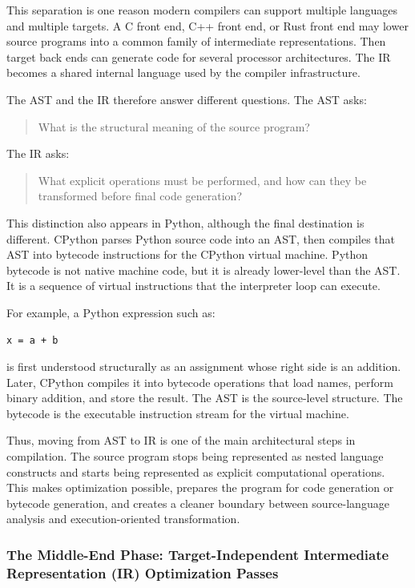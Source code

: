 This separation is one reason modern compilers can support multiple languages and multiple targets. A C front end, C++ front end, or Rust front end may lower source programs into a common family of intermediate representations. Then target back ends can generate code for several processor architectures. The IR becomes a shared internal language used by the compiler infrastructure.

The AST and the IR therefore answer different questions. The AST asks:

\begin{quote}
What is the structural meaning of the source program?
\end{quote}

The IR asks:

\begin{quote}
What explicit operations must be performed, and how can they be transformed before final code generation?
\end{quote}

This distinction also appears in Python, although the final destination is different. CPython parses Python source code into an AST, then compiles that AST into bytecode instructions for the CPython virtual machine. Python bytecode is not native machine code, but it is already lower-level than the AST. It is a sequence of virtual instructions that the interpreter loop can execute.

For example, a Python expression such as:

\begin{verbatim}
x = a + b
\end{verbatim}

is first understood structurally as an assignment whose right side is an addition. Later, CPython compiles it into bytecode operations that load names, perform binary addition, and store the result. The AST is the source-level structure. The bytecode is the executable instruction stream for the virtual machine.

Thus, moving from AST to IR is one of the main architectural steps in compilation. The source program stops being represented as nested language constructs and starts being represented as explicit computational operations. This makes optimization possible, prepares the program for code generation or bytecode generation, and creates a cleaner boundary between source-language analysis and execution-oriented transformation.


\subsubsection{The Middle-End Phase: Target-Independent Intermediate Representation (IR) Optimization Passes}

